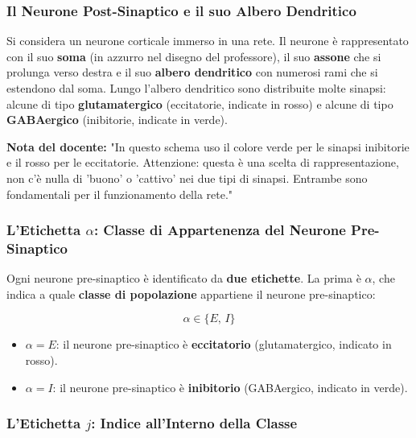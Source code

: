 \subsubsection{Il Neurone Post-Sinaptico e il suo Albero Dendritico}

Si considera un neurone corticale immerso in una rete. Il neurone è rappresentato con il suo \textbf{soma} (in azzurro nel disegno del professore), il suo \textbf{assone} che si prolunga verso destra e il suo \textbf{albero dendritico} con numerosi rami che si estendono dal soma. Lungo l'albero dendritico sono distribuite molte sinapsi: alcune di tipo \textbf{glutamatergico} (eccitatorie, indicate in rosso) e alcune di tipo \textbf{GABAergico} (inibitorie, indicate in verde).

\begin{tcolorbox}[colback=gray!5, colframe=gray!40, arc=2mm, boxrule=0.5pt]
\textbf{Nota del docente:} "In questo schema uso il colore verde per le sinapsi inibitorie e il rosso per le eccitatorie. Attenzione: questa è una scelta di rappresentazione, non c'è nulla di 'buono' o 'cattivo' nei due tipi di sinapsi. Entrambe sono fondamentali per il funzionamento della rete."
\end{tcolorbox}

\subsubsection{L'Etichetta $\alpha$: Classe di Appartenenza del Neurone Pre-Sinaptico}

Ogni neurone pre-sinaptico è identificato da \textbf{due etichette}. La prima è $\alpha$, che indica a quale \textbf{classe di popolazione} appartiene il neurone pre-sinaptico:

\begin{equation}
\alpha \in \{E,\, I\}
\end{equation}

\begin{itemize}
    \item $\alpha = E$: il neurone pre-sinaptico è \textbf{eccitatorio} (glutamatergico, indicato in rosso).
    \item $\alpha = I$: il neurone pre-sinaptico è \textbf{inibitorio} (GABAergico, indicato in verde).
\end{itemize}

\subsubsection{L'Etichetta $j$: Indice all'Interno della Classe}

